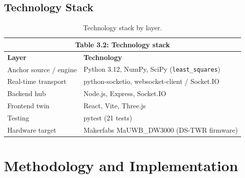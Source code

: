 \documentclass[a4paper,12pt,onecolumn]{report}
\begin{document}
\section{Technology Stack}
\begin{table}[H]
\begin{center}
\begin{tabular}{ | l | l | }
\hline
\multicolumn{2}{|c|}{\textbf{Table 3.2: Technology stack}}\\
\hline
\textbf{Layer} & \textbf{Technology}\\ \hline
Anchor source / engine & Python 3.12, NumPy, SciPy (\texttt{least\_squares}) \\ \hline
Real-time transport & python-socketio, websocket-client / Socket.IO \\ \hline
Backend hub & Node.js, Express, Socket.IO \\ \hline
Frontend twin & React, Vite, Three.js \\ \hline
Testing & pytest (21 tests) \\ \hline
Hardware target & Makerfabs MaUWB\_DW3000 (DS-TWR firmware) \\
\hline
\end{tabular}
\caption{Technology stack by layer.}
\label{tab:stack}
\end{center}
\end{table}

\chapter{Methodology and Implementation}
\end{document}
